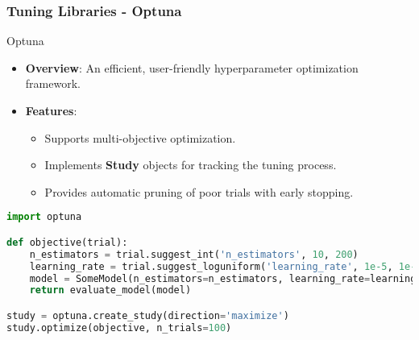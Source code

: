 \documentclass[aspectratio=169]{beamer}
\begin{document}
\begin{frame}[fragile]
    \frametitle{Tuning Libraries - Optuna}
    \begin{block}{Optuna}
        \begin{itemize}
            \item \textbf{Overview}: An efficient, user-friendly hyperparameter optimization framework.
            \item \textbf{Features}:
            \begin{itemize}
                \item Supports multi-objective optimization.
                \item Implements \textbf{Study} objects for tracking the tuning process.
                \item Provides automatic pruning of poor trials with early stopping.
            \end{itemize}
        \end{itemize}
    \end{block}
    \begin{lstlisting}[language=Python]
import optuna

def objective(trial):
    n_estimators = trial.suggest_int('n_estimators', 10, 200)
    learning_rate = trial.suggest_loguniform('learning_rate', 1e-5, 1e-1)
    model = SomeModel(n_estimators=n_estimators, learning_rate=learning_rate)
    return evaluate_model(model)

study = optuna.create_study(direction='maximize')
study.optimize(objective, n_trials=100)
    \end{lstlisting}
\end{frame}
\end{document}
